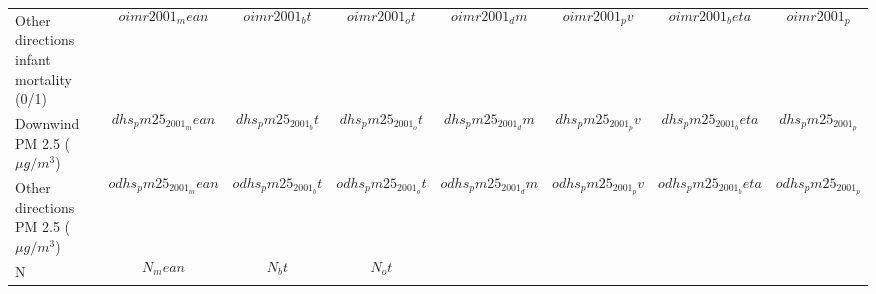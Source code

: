 \begin{center}
{\begin{tabular}{l c c c c c c c}
Other directions infant mortality (0/1)    & $$oimr2001_mean$$          & $$oimr2001_bt$$          & $$oimr2001_ot$$          & $$oimr2001_dm$$          & $$oimr2001_pv$$          & $$oimr2001_beta$$          & $$oimr2001_p$$          \\
Downwind PM 2.5 ($\mu g/m^{3}$)   & $$dhs_pm25_2001_mean$$          & $$dhs_pm25_2001_bt$$          & $$dhs_pm25_2001_ot$$          & $$dhs_pm25_2001_dm$$          & $$dhs_pm25_2001_pv$$          & $$dhs_pm25_2001_beta$$          & $$dhs_pm25_2001_p$$          \\
Other directions PM 2.5 ($\mu g/m^{3}$)   & $$odhs_pm25_2001_mean$$          & $$odhs_pm25_2001_bt$$          & $$odhs_pm25_2001_ot$$          & $$odhs_pm25_2001_dm$$          & $$odhs_pm25_2001_pv$$          & $$odhs_pm25_2001_beta$$          & $$odhs_pm25_2001_p$$          \\
\hline                                                                  
N                                  & $$N_mean$$                        & $$N_bt$$                        & $$N_ot$$                        &                                 &                                 &                                 &                                  \\
\hline 
\end{tabular} }  
\end{center}

